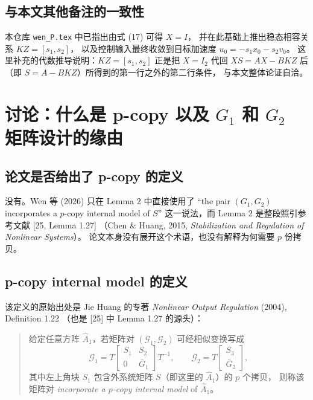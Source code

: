 \subsection{与本文其他备注的一致性}

本仓库 \texttt{wen\_P.tex} 中已指出由式 (17) 可得 $X=I$，
并在此基础上推出稳态相容关系 $KZ=[s_1,s_2]$，
以及控制输入最终收敛到目标加速度 $u_0=-s_1x_0-s_2v_0$。
这里补充的代数推导说明：$KZ=[s_1,s_2]$ 正是把 $X=I_2$ 代回
$XS=AX-BKZ$ 后（即 $S=A-BKZ$）所得到的第一行之外的第二行条件，
与本文整体论证自洽。


\section{讨论：什么是 p-copy 以及 $G_1$ 和 $G_2$ 矩阵设计的缘由}

\subsection{论文是否给出了 p-copy 的定义}

没有。Wen 等 (2026) 只在 Lemma 2 中直接使用了
“the pair $(G_1,G_2)$ incorporates a $p$-copy internal model of $S$”
这一说法，而 Lemma 2 是整段照引参考文献 [25, Lemma 1.27]
（Chen \& Huang, 2015, \emph{Stabilization and Regulation of Nonlinear Systems}）。
论文本身没有展开这个术语，也没有解释为何需要 $p$ 份拷贝。

\subsection{p-copy internal model 的定义}

该定义的原始出处是 Jie Huang 的专著
\emph{Nonlinear Output Regulation} (2004), Definition 1.22
（也是 [25] 中 Lemma 1.27 的源头）：

\begin{quote}
给定任意方阵 $\hat A_1$，若矩阵对 $(\mathcal G_1, \mathcal G_2)$ 可经相似变换写成
\[
\mathcal G_1 = T\begin{bmatrix} S_1 & S_2 \\ 0 & \bar G_1\end{bmatrix}T^{-1},
\qquad
\mathcal G_2 = T\begin{bmatrix} S_3 \\ \bar G_2\end{bmatrix},
\]
其中左上角块 $S_1$ 包含外系统矩阵 $S$（即这里的 $\hat A_1$）的 $p$ 个拷贝，
则称该矩阵对 \emph{incorporate a $p$-copy internal model} of $\hat A_1$。
\end{quote}

